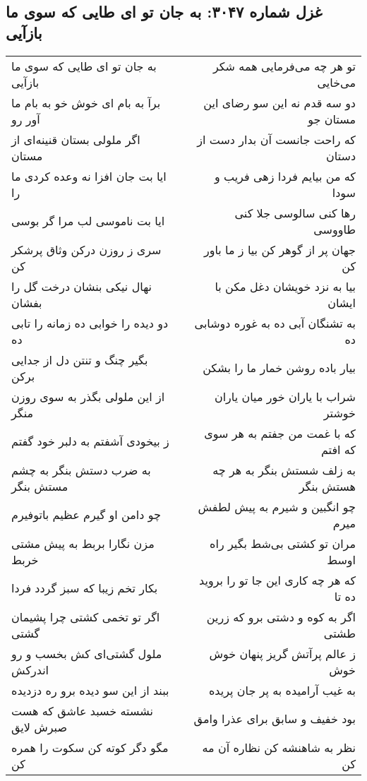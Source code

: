 \begin{center}
\section*{غزل شماره ۳۰۴۷: به جان تو ای طایی که سوی ما بازآیی}
\label{sec:3047}
\begin{longtable}{l p{0.5cm} r}
به جان تو ای طایی که سوی ما بازآیی
&&
تو هر چه می‌فرمایی همه شکر می‌خایی
\\
برآ به بام ای خوش خو به بام ما آور رو
&&
دو سه قدم نه این سو رضای این مستان جو
\\
اگر ملولی بستان قنینه‌ای از مستان
&&
که راحت جانست آن بدار دست از دستان
\\
ایا بت جان افزا نه وعده کردی ما را
&&
که من بیایم فردا زهی فریب و سودا
\\
ایا بت ناموسی لب مرا گر بوسی
&&
رها کنی سالوسی جلا کنی طاووسی
\\
سری ز روزن درکن وثاق پرشکر کن
&&
جهان پر از گوهر کن بیا ز ما باور کن
\\
نهال نیکی بنشان درخت گل را بفشان
&&
بیا به نزد خویشان دغل مکن با ایشان
\\
دو دیده را خوابی ده زمانه را تابی ده
&&
به تشنگان آبی ده به غوره دوشابی ده
\\
بگیر چنگ و تنتن دل از جدایی برکن
&&
بیار باده روشن خمار ما را بشکن
\\
از این ملولی بگذر به سوی روزن منگر
&&
شراب با یاران خور میان یاران خوشتر
\\
ز بیخودی آشفتم به دلبر خود گفتم
&&
که با غمت من جفتم به هر سوی که افتم
\\
به ضرب دستش بنگر به چشم مستش بنگر
&&
به زلف شستش بنگر به هر چه هستش بنگر
\\
چو دامن او گیرم عظیم باتوفیرم
&&
چو انگبین و شیرم به پیش لطفش میرم
\\
مزن نگارا بربط به پیش مشتی خربط
&&
مران تو کشتی بی‌شط بگیر راه اوسط
\\
بکار تخم زیبا که سبز گردد فردا
&&
که هر چه کاری این جا تو را بروید ده تا
\\
اگر تو تخمی کشتی چرا پشیمان گشتی
&&
اگر به کوه و دشتی برو که زرین طشتی
\\
ملول گشتی‌ای کش بخسب و رو اندرکش
&&
ز عالم پرآتش گریز پنهان خوش خوش
\\
ببند از این سو دیده برو ره دزدیده
&&
به غیب آرامیده به پر جان پریده
\\
نشسته خسبد عاشق که هست صبرش لایق
&&
بود خفیف و سابق برای عذرا وامق
\\
مگو دگر کوته کن سکوت را همره کن
&&
نظر به شاهنشه کن نظاره آن مه کن
\\
\end{longtable}
\end{center}

